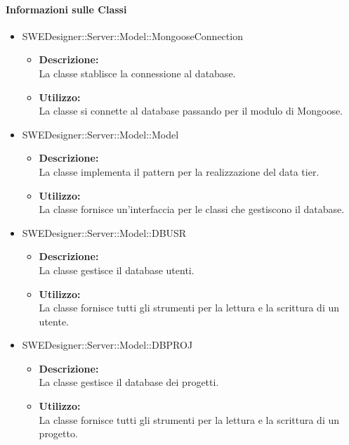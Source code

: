 		\paragraph{Informazioni sulle Classi}
		\begin{itemize}
			\item SWEDesigner::Server::Model::MongooseConnection
			\begin{itemize}
				\item \textbf{Descrizione: }\\
				La classe stablisce la connessione al database.
				\item \textbf{Utilizzo: }\\
				La classe si connette al database passando per il modulo di Mongoose.
			\end{itemize}
			\item SWEDesigner::Server::Model::Model
			\begin{itemize}
				\item \textbf{Descrizione: }\\
				La classe implementa il pattern  per la realizzazione del data tier.
				\item \textbf{Utilizzo: }\\
				La classe fornisce un'interfaccia per le classi che gestiscono il database.
			\end{itemize}
			\item SWEDesigner::Server::Model::DBUSR
			\begin{itemize}
				\item \textbf{Descrizione: }\\
				La classe gestisce il database utenti.
				\item \textbf{Utilizzo: }\\
				La classe fornisce tutti gli strumenti per la lettura e la scrittura di un utente.
			\end{itemize}
			\item SWEDesigner::Server::Model::DBPROJ
			\begin{itemize}
				\item \textbf{Descrizione: }\\
				La classe gestisce il database dei progetti.
				\item \textbf{Utilizzo: }\\
				La classe fornisce tutti gli strumenti per la lettura e la scrittura di un progetto.
			\end{itemize}
		\end{itemize}


